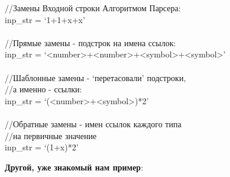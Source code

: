 \documentclass{book}
\newcommand{\less}{\textless}
\newcommand{\more}{\textgreater}
\begin{document}
\begin{tcolorbox}[breakable]
//Замены Входной строки Алгоритмом Парсера: \\
inp\_str = `1+1+x+x' \\
\\
//Прямые замены - подстрок на имена ссылок: \\
inp\_str = `\less number\more+\less number\more+\less symbol\more+\less symbol\more' \\
\\
//Шаблонные замены - `перетасовали' подстроки, \\ 
//а именно - ссылки: \\
inp\_str = `(\less number\more+\less symbol\more)*2' \\
\\
//Обратные замены - имен ссылок каждого типа \\
//на первичные значение \\
inp\_str = `(1+x)*2'
\end{tcolorbox}

\textbf{Другой, уже знакомый нам пример}:
\end{document}
